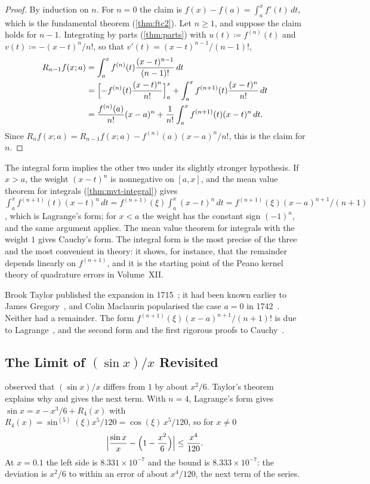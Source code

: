 \begin{proof}
By induction on $n$. For $n=0$ the claim is $f(x)-f(a)=\int_a^xf'(t)\,dt$, which is the fundamental theorem (\cref{thm:ftc2}). Let $n\ge1$, and suppose the claim holds for $n-1$. Integrating by parts (\cref{thm:parts}) with $u(t)\coloneqq f^{(n)}(t)$ and $v(t)\coloneqq-(x-t)^n/n!$, so that $v'(t)=(x-t)^{n-1}/(n-1)!$,
\begin{align*}
R_{n-1}f(x;a)&=\int_a^xf^{(n)}(t)\frac{(x-t)^{n-1}}{(n-1)!}\,dt\\
&=\Bigl[-f^{(n)}(t)\frac{(x-t)^n}{n!}\Bigr]_a^x+\int_a^xf^{(n+1)}(t)\frac{(x-t)^n}{n!}\,dt\\
&=\frac{f^{(n)}(a)}{n!}(x-a)^n+\frac1{n!}\int_a^xf^{(n+1)}(t)(x-t)^n\,dt .
\end{align*}
Since $R_nf(x;a)=R_{n-1}f(x;a)-f^{(n)}(a)(x-a)^n/n!$, this is the claim for $n$.
\end{proof}

The integral form implies the other two under its slightly stronger hypothesis. If $x>a$, the weight $(x-t)^n$ is nonnegative on $[a,x]$, and the mean value theorem for integrals (\cref{thm:mvt-integral}) gives $\int_a^xf^{(n+1)}(t)(x-t)^n\,dt=f^{(n+1)}(\xi)\int_a^x(x-t)^n\,dt=f^{(n+1)}(\xi)(x-a)^{n+1}/(n+1)$, which is Lagrange's form; for $x<a$ the weight has the constant sign $(-1)^n$, and the same argument applies. The mean value theorem for integrals with the weight $1$ gives Cauchy's form. The integral form is the most precise of the three and the most convenient in theory: it shows, for instance, that the remainder depends linearly on $f^{(n+1)}$, and it is the starting point of the Peano kernel theory of quadrature errors in Volume~XII.

Brook Taylor published the expansion in 1715~\cite{taylor1715}; it had been known earlier to James Gregory~\cite{edwards1979}, and Colin Maclaurin popularised the case $a=0$ in 1742~\cite{maclaurin1742}. Neither had a remainder. The form $f^{(n+1)}(\xi)(x-a)^{n+1}/(n+1)!$ is due to Lagrange~\cite{lagrange1797}, and the second form and the first rigorous proofs to Cauchy~\cite{cauchy1823,grabiner1981}.

\subsection{The Limit of \texorpdfstring{$(\sin x)/x$}{sin(x)/x} Revisited}

 observed that $(\sin x)/x$ differs from $1$ by about $x^2/6$. Taylor's theorem explains why and gives the next term. With $n=4$, Lagrange's form gives $\sin x=x-x^3/6+R_4(x)$ with $R_4(x)=\sin^{(5)}(\xi)x^5/120=\cos(\xi)\,x^5/120$, so for $x\ne0$
\[
\Bigl|\frac{\sin x}x-\Bigl(1-\frac{x^2}6\Bigr)\Bigr|\le\frac{x^4}{120} .
\]
At $x=0.1$ the left side is $8.331\times10^{-7}$ and the bound is $8.333\times10^{-7}$: the deviation is $x^2/6$ to within an error of about $x^4/120$, the next term of the series.

